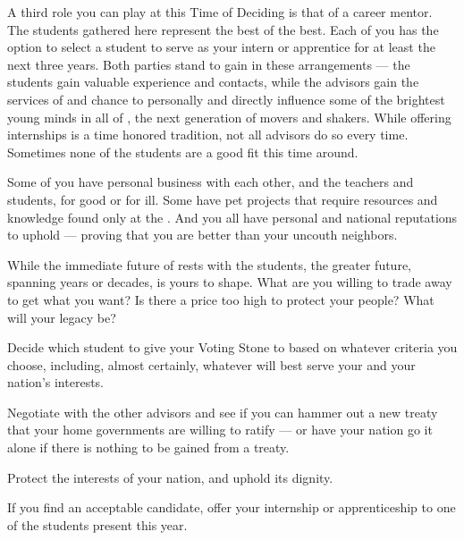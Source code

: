 \documentclass[blue]{GL2020}
\begin{document}
A third role you can play at this Time of Deciding is that of a career mentor. The students gathered here represent the best of the best. Each of you has the option to select a student to serve as your intern or apprentice for at least the next three years. Both parties stand to gain in these arrangements — the students gain valuable experience and contacts, while the advisors gain the services of and chance to personally and directly influence some of the brightest young minds in all of \pEarth{}, the next generation of movers and shakers. While offering internships is a time honored tradition, not all advisors do so every time. Sometimes none of the students are a good fit this time around.

Some of you have personal business with each other, and the teachers and students, for good or for ill. Some have pet projects that require resources and knowledge found only at the \pSc{}. And you all have personal and national reputations to uphold — proving that you are better than your uncouth neighbors.

While the immediate future of \pEarth{} rests with the students, the greater future, spanning years or decades, is yours to shape. What are you willing to trade away to get what you want? Is there a price too high to protect your people? What will your legacy be?

\begin{itemz}[Goals]
    \item Decide which student to give your Voting Stone to based on whatever criteria you choose, including, almost certainly, whatever will best serve your and your nation’s interests.
    \item Negotiate with the other advisors and see if you can hammer out a new treaty that your home governments are willing to ratify — or have your nation go it alone if there is nothing to be gained from a treaty.
    \item Protect the interests of your nation, and uphold its dignity.
    \item If you find an acceptable candidate, offer your internship or apprenticeship to one of the students present this year.
\end{itemz}
\end{document}
